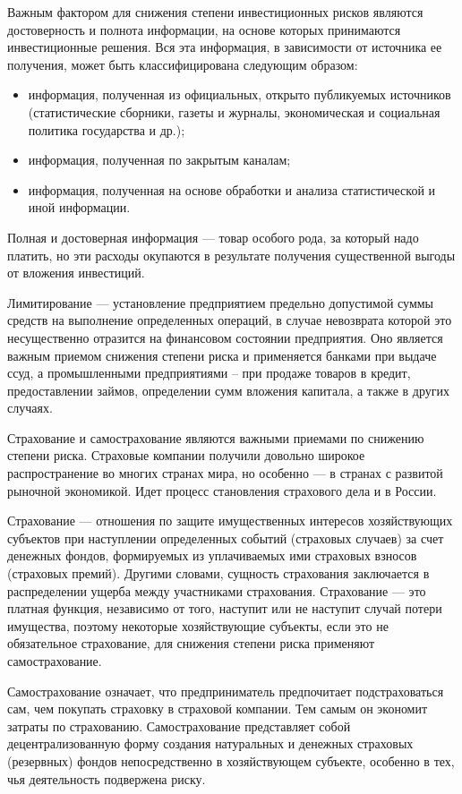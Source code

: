 Важным фактором для снижения степени инвестиционных рисков являются достоверность и полнота информации, на основе которых принимаются инвестиционные решения.
Вся эта информация, в зависимости от источника ее получения, может быть классифицирована следующим образом: 
\begin{itemize}
\setlength\itemsep{0pt}
\item информация, полученная из официальных, открыто публикуемых источников (статистические сборники, газеты и журналы, экономическая и социальная политика государства и др.); 
\item  информация, полученная по закрытым каналам; 
\item  информация, полученная на основе обработки и анализа статистической и иной информации.
\end{itemize}

Полная и достоверная информация --- товар особого рода, за который надо платить, но эти расходы окупаются в результате получения существенной выгоды от вложения инвестиций.

Лимитирование --- установление предприятием предельно допустимой суммы средств на выполнение определенных операций, в случае невозврата которой это несущественно отразится на финансовом состоянии предприятия.
Оно является важным приемом снижения степени риска и применяется банками при выдаче ссуд, а промышленными предприятиями -- при продаже товаров в кредит, предоставлении займов, определении сумм вложения капитала, а также в других случаях.

Страхование и самострахование являются важными приемами по снижению степени риска.
Страховые компании получили довольно широкое распространение во многих странах мира, но особенно --- в странах с развитой рыночной экономикой. Идет процесс становления страхового дела и в России.

Страхование --- отношения по защите имущественных интересов хозяйствующих субъектов при наступлении определенных событий (страховых случаев) за счет денежных фондов, формируемых из уплачиваемых ими страховых взносов (страховых премий).
Другими словами, сущность страхования заключается в распределении ущерба между участниками страхования.
Страхование --- это платная функция, независимо от того, наступит или не наступит случай потери имущества, поэтому некоторые хозяйствующие субъекты, если это не обязательное страхование, для снижения степени риска применяют самострахование.

Самострахование означает, что предприниматель предпочитает подстраховаться сам, чем покупать страховку в страховой компании.
Тем самым он экономит затраты по страхованию.
Самострахование представляет собой децентрализованную форму создания натуральных и денежных страховых (резервных) фондов непосредственно в хозяйствующем субъекте, особенно в тех, чья деятельность подвержена риску.

